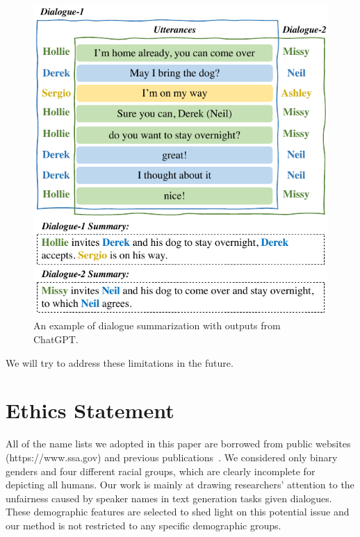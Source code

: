 \begin{figure}[h!]
	\centering
	\includegraphics[width=0.95\linewidth]{case-chatgpt.pdf}
	\caption{An example of dialogue summarization with outputs from ChatGPT.} 
	\label{fig:case-chatgpt}
\end{figure}

We will try to address these limitations in the future.


\section*{Ethics Statement}

All of the name lists we adopted in this paper are borrowed from public websites (https://www.ssa.gov) and previous publications~\cite{tzioumis2018demographic, khalifa2021bag}. We considered only binary genders and four different racial groups, which are clearly incomplete for depicting all humans. Our work is mainly at drawing researchers' attention to the unfairness caused by speaker names in text generation tasks given dialogues. These demographic features are selected to shed light on this potential issue and our method is not restricted to any specific demographic groups.


